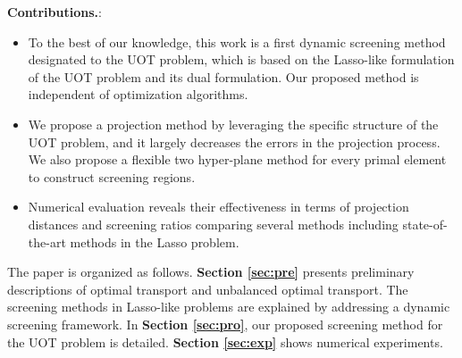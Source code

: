 \documentclass[twoside]{article}
\theoremstyle{plain}
\begin{document}
\textbf{Contributions.}: 
\begin{itemize}
\item To the best of our knowledge, this work is a first dynamic screening method designated to the UOT problem, which is based on the Lasso-like formulation of the UOT problem and its dual formulation. Our proposed method is independent of optimization algorithms.
\item We propose a projection method by leveraging the specific structure of the UOT problem, and it largely decreases the errors in the projection process. 
We also propose a flexible two hyper-plane method  for every primal element to construct screening regions.
\item Numerical evaluation reveals their effectiveness in terms of projection distances and screening ratios comparing several methods including state-of-the-art methods in the Lasso problem.
\end{itemize}



The paper is organized as follows. {\bf Section \ref{sec:pre}} presents preliminary descriptions of optimal transport and unbalanced optimal transport. The screening methods in Lasso-like problems are explained by addressing a dynamic screening framework. In {\bf Section \ref{sec:pro}}, our proposed screening method for the UOT problem is detailed. {\bf Section \ref{sec:exp}} shows numerical experiments.
\end{document}
